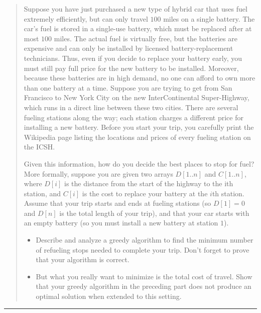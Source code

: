 \documentclass[11pt]{article}
\begin{document}
\begin{quote}
Suppose you have just purchased a new type of hybrid car that
  uses fuel extremely efficiently, but can only travel $100$ miles on a
  single battery. The car’s fuel is stored in a single-use battery,
  which must be replaced after at most $100$ miles. The actual fuel is
  virtually free, but the batteries are expensive and can only be
  installed by licensed battery-replacement technicians. Thus, even if
  you decide to replace your battery early, you must still pay full
  price for the new battery to be installed. Moreover, because these
  batteries are in high demand, no one can afford to own more than one
  battery at a time.  Suppose you are trying to get from San Francisco
  to New York City on the new InterContinental Super-Highway, which
  runs in a direct line between these two cities. There are several
  fueling stations along the way; each station charges a different
  price for installing a new battery. Before you start your trip, you
  carefully print the Wikipedia page listing the locations and prices
  of every fueling station on the ICSH.

  Given this information, how do
  you decide the best places to stop for fuel?  More formally, suppose
  you are given two arrays $D[1 .. n]$ and $C[1 .. n]$, where $D[i]$ is the
  distance from the start of the highway to the ith station, and $C[i]$
  is the cost to replace your battery at the $i$th station. Assume that
  your trip starts and ends at fueling stations (so $D[1] = 0$ and $D[n]$
  is the total length of your trip), and that your car starts with an
  empty battery (so you must install a new battery at station $1$).


  \begin{itemize}
    \item   Describe and analyze a greedy algorithm to find the minimum number
  of refueling stops needed to complete your trip. Don’t forget to
  prove that your algorithm is correct.
    \item   But what you really want
  to minimize is the total cost of travel. Show that your greedy
  algorithm in the preceding part does not produce an optimal solution when
  extended to this setting.
  \end{itemize}
\end{quote}
\hrule
\end{document}

